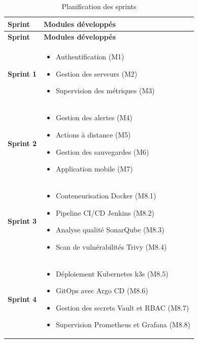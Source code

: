 \begin{longtable}{|p{2.4cm}|>{\raggedright\arraybackslash}p{11.8cm}|}
\hline
\textbf{Sprint} & \textbf{Modules développés} \\
\hline
\endfirsthead

\hline
\textbf{Sprint} & \textbf{Modules développés} \\
\hline
\endhead

\hline
\caption{Planification des sprints}
\label{tab:planification-sprints}
\endlastfoot

\textbf{Sprint 1} &
\begin{itemize}[leftmargin=*, nosep]
  \item Authentification (M1)
  \item Gestion des serveurs (M2)
  \item Supervision des métriques (M3)
\end{itemize} \\
\hline

\textbf{Sprint 2} &
\begin{itemize}[leftmargin=*, nosep]
  \item Gestion des alertes (M4)
  \item Actions à distance (M5)
  \item Gestion des sauvegardes (M6)
  \item Application mobile (M7)
\end{itemize} \\
\hline

\textbf{Sprint 3} &
\begin{itemize}[leftmargin=*, nosep]
  \item Conteneurisation Docker (M8.1)
  \item Pipeline CI/CD Jenkins (M8.2)
  \item Analyse qualité SonarQube (M8.3)
  \item Scan de vulnérabilités Trivy (M8.4)
\end{itemize} \\
\hline

\textbf{Sprint 4} &
\begin{itemize}[leftmargin=*, nosep]
  \item Déploiement Kubernetes k3s (M8.5)
  \item GitOps avec Argo CD (M8.6)
  \item Gestion des secrets Vault et RBAC (M8.7)
  \item Supervision Prometheus et Grafana (M8.8)
\end{itemize} \\
\hline

\end{longtable}

